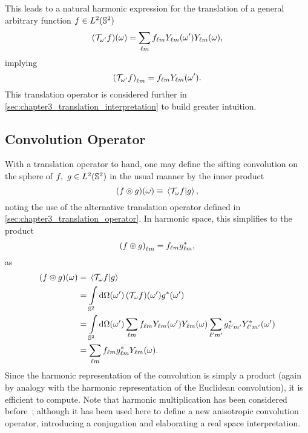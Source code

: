This leads to a natural harmonic expression for the translation of a general arbitrary function \(f \in \hilbert{\twoSphere}\)
%
\begin{equation}\label{eq:chapter3_translation_real}
    \pixel{(\translation{\omega'}f)}
    = \harmonicSum \harmonic{f} \pixel[']{\harmonic{Y}} \pixel{\harmonic{Y}},
\end{equation}
%
implying
%
\begin{equation}\label{eq:chapter3_translation_harmonic}
    \harmonic{(\translation{\omega'}f)}
    = \harmonic{f} \pixel[']{\harmonic{Y}}.
\end{equation}
%
This translation operator is considered further in \cref{sec:chapter3_translation_interpretation} to build greater intuition.

\subsection{Convolution Operator}

With a translation operator to hand, one may define the sifting convolution on the sphere of \(f,\ g \in \hilbert{\twoSphere}\) in the usual manner by the inner product
%
\begin{equation}\label{eq:chapter3_convolution_real}
    \pixel{\convolution{f}{g}}
    \equiv \braket*{\translation{\omega}f}{g},
\end{equation}
%
noting the use of the alternative translation operator defined in \cref{sec:chapter3_translation_operator}.
In harmonic space, this simplifies to the product
%
\begin{equation}\label{eq:chapter3_convolution_harmonic}
    \harmonic{\convolution{f}{g}}
    = \harmonic{f} \conj{\harmonic{g}},
\end{equation}
%
as
%
\begin{align}
    \pixel{(f \circledcirc g)}
     & = \braket*{\translation{\omega}f}{g} \nonumber{}                                                                                                                                        \\
     & = \integrateSphere{\omega'} \pixel[']{(\translation{\omega}f)} \pixel[']{\conj{g}} \nonumber{}                                                                                          \\
     & = \integrateSphere{\omega'} \harmonicSum \harmonic{f} \pixel[']{\harmonic{Y}} \pixel{\harmonic{Y}} \harmonicSum['] \conj{\harmonic[']{g}} \pixel[']{\conj{\harmonic[']{Y}}} \nonumber{} \\
     & = \harmonicSum \harmonic{f} \conj{\harmonic{g}} \pixel{\harmonic{Y}}.
\end{align}
%
Since the harmonic representation of the convolution is simply a product (again by analogy with the harmonic representation of the Euclidean convolution), it is efficient to compute.
Note that harmonic multiplication has been considered before~\cite{Kennedy2011}; although it has been used here to define a new anisotropic convolution operator, introducing a conjugation and elaborating a real space interpretation.


